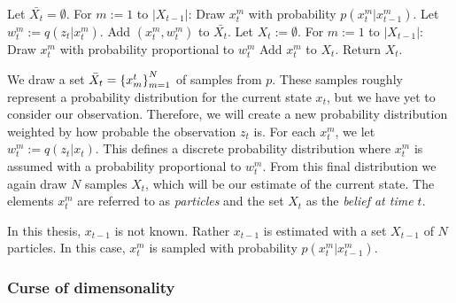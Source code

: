 \begin{codebox}
\li Let $\bar{X_t} = \emptyset$.
\li For $m:=1$ to $\left|X_{t-1}\right|$:
\li \Do Draw $x_t^m$ with probability $p\left(x_t^m | x_{t-1}^m\right)$.
\li Let $w_t^m := q\left(z_t | x_t^m\right)$.
\li Add $(x_t^m, w_t^m)$ to $\bar{X_t}$.
\End
\li Let $X_t := \emptyset$.
\li For $m:=1$ to $\left|X_{t-1}\right|$:
\li \Do
    Draw $x_t^m$ with probability proportional to $w_t^m$
    \li Add $x_t^m$ to $X_t$.
    \End
\li Return $X_t$.
\end{codebox}


We draw a set $\bar{X}_t = \left\{x_{m}^{t}\right\}_{m=1}^{N}$ of samples from $p$. These samples roughly represent a probability distribution for the current state $x_t$, but we have yet to consider our observation. Therefore, we will create a new probability distribution weighted by how probable the observation $z_t$ is. For each $x_t^m$, we let $w_t^m := q\left(z_t | x_t\right)$. This defines a discrete probability distribution where $x_t^m$ is assumed with a probability proportional to $w_t^m$. From this final distribution we again draw $N$ samples $X_t$, which will be our estimate of the current state. The elements $x_t^m$ are referred to as \emph{particles} and the set $X_t$ as the \emph{belief at time $t$}.

In this thesis, $x_{t-1}$ is not known. Rather $x_{t-1}$ is estimated with a set $X_{t-1}$ of $N$ particles. In this case, $x_t^m$ is sampled with probability $p\left(x_t^m | x_{t-1}^m\right)$.



\subsubsection{Curse of dimensonality}




